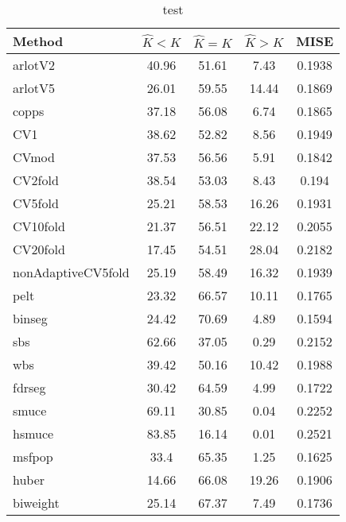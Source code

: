 \begin{table}[ht]
\centering
\begin{tabular}{l|cccc}
  \hline
Method & $\hat{K} < K$ & $\hat{K} = K$ & $\hat{K} > K$ & MISE \\ 
  \hline
arlotV2 & 40.96 & 51.61 &  7.43 & 0.1938 \\ 
  arlotV5 & 26.01 & 59.55 & 14.44 & 0.1869 \\ 
  copps & 37.18 & 56.08 &  6.74 & 0.1865 \\ 
  CV1 & 38.62 & 52.82 &  8.56 & 0.1949 \\ 
  CVmod & 37.53 & 56.56 &  5.91 & 0.1842 \\ 
  CV2fold & 38.54 & 53.03 &  8.43 & 0.194 \\ 
  CV5fold & 25.21 & 58.53 & 16.26 & 0.1931 \\ 
  CV10fold & 21.37 & 56.51 & 22.12 & 0.2055 \\ 
  CV20fold & 17.45 & 54.51 & 28.04 & 0.2182 \\ 
  nonAdaptiveCV5fold & 25.19 & 58.49 & 16.32 & 0.1939 \\ 
  pelt & 23.32 & 66.57 & 10.11 & 0.1765 \\ 
  binseg & 24.42 & 70.69 &  4.89 & 0.1594 \\ 
  sbs & 62.66 & 37.05 &  0.29 & 0.2152 \\ 
  wbs & 39.42 & 50.16 & 10.42 & 0.1988 \\ 
  fdrseg & 30.42 & 64.59 &  4.99 & 0.1722 \\ 
  smuce & 69.11 & 30.85 &  0.04 & 0.2252 \\ 
  hsmuce & 83.85 & 16.14 &  0.01 & 0.2521 \\ 
  msfpop &  33.4 & 65.35 &  1.25 & 0.1625 \\ 
  huber & 14.66 & 66.08 & 19.26 & 0.1906 \\ 
  biweight & 25.14 & 67.37 &  7.49 & 0.1736 \\ 
   \hline
\end{tabular}
\caption{test} 
\end{table}
